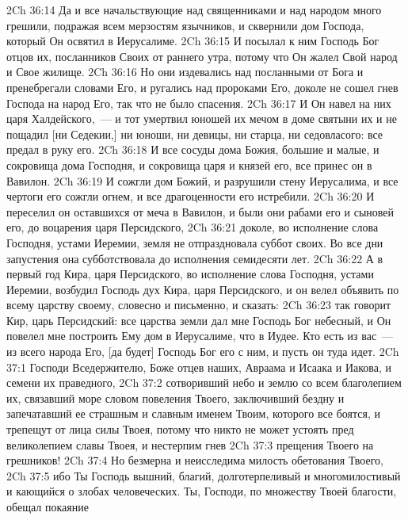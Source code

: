 \vs 2Ch 36:14 Да и все начальствующие над священниками и над народом много грешили, подражая всем мерзостям язычников, и сквернили дом Господа, который Он освятил в Иерусалиме.
\vs 2Ch 36:15 И посылал к ним Господь Бог отцов их, посланников Своих от раннего утра, потому что Он жалел Свой народ и Свое жилище.
\vs 2Ch 36:16 Но они издевались над посланными от Бога и пренебрегали словами Его, и ругались над пророками Его, доколе не сошел гнев Господа на народ Его, так что не было  спасения.
\vs 2Ch 36:17 И Он навел на них царя Халдейского,~--- и тот умертвил юношей их мечом в доме святыни их и не пощадил [ни Седекии,] ни юноши, ни девицы, ни старца, ни седовласого: все предал  в руку его.
\vs 2Ch 36:18 И все сосуды дома Божия, большие и малые, и сокровища дома Господня, и сокровища царя и князей его, все принес он в Вавилон.
\vs 2Ch 36:19 И сожгли дом Божий, и разрушили стену Иерусалима, и все чертоги его сожгли огнем, и все драгоценности его истребили.
\vs 2Ch 36:20 И переселил он оставшихся от меча в Вавилон, и были они рабами его и сыновей его, до воцарения царя Персидского,
\vs 2Ch 36:21 доколе, во исполнение слова Господня,  устами Иеремии, земля не отпраздновала суббот своих. Во все дни запустения она субботствовала до исполнения семидесяти лет.
\rsbpar\vs 2Ch 36:22 А в первый год Кира, царя Персидского, во исполнение слова Господня,  устами Иеремии, возбудил Господь дух Кира, царя Персидского, и он велел объявить по всему царству своему, словесно и письменно, и сказать:
\vs 2Ch 36:23 так говорит Кир, царь Персидский: все царства земли дал мне Господь Бог небесный, и Он повелел мне построить Ему дом в Иерусалиме, что в Иудее. Кто есть из вас~--- из всего народа Его, [да будет] Господь Бог его с ним, и пусть он туда идет.
\vs 2Ch 37:1 Господи Вседержителю, Боже отцев наших, Авраама и Исаака и Иакова, и семени их праведного,
\vs 2Ch 37:2 сотворивший небо и землю со всем благолепием их, связавший море словом повеления Твоего, заключивший бездну и запечатавший ее страшным и славным именем Твоим, которого все боятся, и трепещут от лица силы Твоея, потому что никто не может устоять пред великолепием славы Твоея, и нестерпим гнев
\vs 2Ch 37:3 прещения Твоего на грешников!
\vs 2Ch 37:4 Но безмерна и неисследима милость обетования Твоего,
\vs 2Ch 37:5 ибо Ты Господь вышний, благий, долготерпеливый и многомилостивый и кающийся о злобах человеческих. Ты, Господи, по множеству Твоей благости, обещал покаяние
